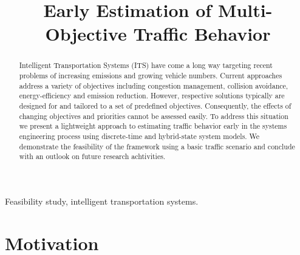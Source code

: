 \documentclass[conference]{../cls/IEEEtran}
\begin{document}
\title{Early Estimation of Multi-Objective Traffic Behavior}

\author{
	\and
}

\maketitle

\begin{abstract}
Intelligent Transportation Systems (ITS) have come a long way targeting recent
problems of increasing emissions and growing vehicle numbers. Current approaches
address a variety of objectives including congestion management, collision
avoidance, energy-efficiency and emission reduction. However, respective
solutions typically are designed for and tailored to a set of predefined
objectives. Consequently, the effects of changing objectives and priorities
cannot be assessed easily. To address this situation we present a lightweight approach to estimating traffic behavior early in the systems engineering process using discrete-time and hybrid-state system models. We demonstrate the feasibility of the framework using a basic traffic scenario and conclude with an outlook on future research achtivities.
\end{abstract}

\begin{IEEEkeywords}
Feasibility study, intelligent transportation systems.
\end{IEEEkeywords}

\section{Motivation}
\label{sec:motivation}
\end{document}
